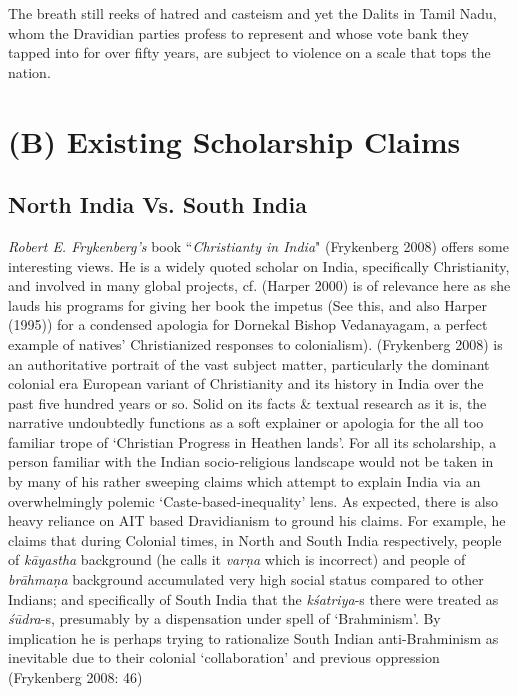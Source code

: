 The breath still reeks of hatred and casteism and yet the Dalits in Tamil Nadu, whom the Dravidian parties profess to represent and whose vote bank they tapped into for over fifty years, are subject to violence on a scale that tops the nation.



\section*{(B) Existing Scholarship Claims}

\subsection*{North India Vs. South India}

\textit{Robert E. Frykenberg’s} book “\textit{Christianty in India}" (Frykenberg 2008) offers some interesting views. He is a widely quoted scholar on India, specifically Christianity, and involved in many global projects, cf. (Harper 2000) is of relevance here as she lauds his programs for giving her book the impetus (See this, and also Harper (1995)) for a condensed apologia for Dornekal Bishop Vedanayagam, a perfect example of natives’ Christianized responses to colonialism). (Frykenberg 2008) is an authoritative portrait of the vast subject matter, particularly the dominant colonial era European variant of Christianity and its history in India over the past five hundred years or so. Solid on its facts \& textual research as it is, the narrative undoubtedly functions as a soft explainer or apologia for the all too familiar trope of ‘Christian Progress in Heathen lands’. For all its scholarship, a person familiar with the Indian socio-religious landscape would not be taken in by many of his rather sweeping claims which attempt to explain India via an overwhelmingly polemic ‘Caste-based-inequality’ lens. As expected, there is also heavy reliance on AIT based Dravidianism to ground his claims. For example, he claims that during Colonial times, in North and South India respectively, people of \textit{kāyastha} background (he calls it \textit{varṇa} which is incorrect) and people of \textit{brāhmaṇa} background accumulated very high social status compared to other Indians; and specifically of South India that the \textit{kśatriya}-s there were treated as \textit{śūdra}-s, presumably by a dispensation under spell of ‘Brahminism’. By implication he is perhaps trying to rationalize South Indian anti-Brahminism as inevitable due to their colonial ‘collaboration’ and previous oppression (Frykenberg 2008: 46)

